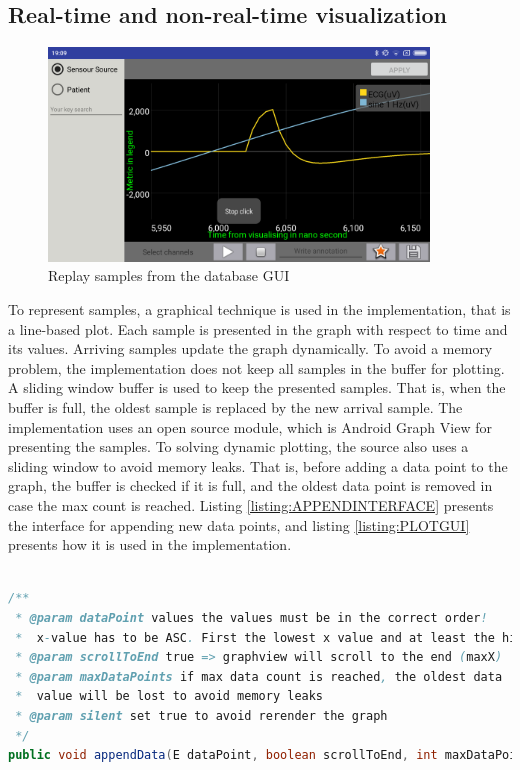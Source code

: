 \subsection{Real-time and non-real-time visualization}
\begin{figure}
    \centering
    \includegraphics[width=0.9\textwidth]{Figures/NONPLOT.png}
    \caption{Replay samples from the database GUI}
    \label{fig:Figures/NONPLOT}
\end{figure}
To represent samples, a graphical technique is used in the implementation, that is a line-based plot. Each sample is presented in the graph with respect to time and its values. Arriving samples update the graph dynamically. To avoid a memory problem, the implementation does not keep all samples in the buffer for plotting. A sliding window buffer is used to keep the presented samples. That is, when the buffer is full, the oldest sample is replaced by the new arrival sample. The implementation uses an open source module, which is Android Graph View\citep{GRAPHVIEWMAIN} for presenting the samples. To solving dynamic plotting, the source also uses a sliding window to avoid memory leaks. That is, before adding a data point to the graph, the buffer is checked if it is full, and the oldest data point is removed in case the max count is reached. Listing \ref{listing:APPENDINTERFACE}\citep{GRAPHVIEW} presents the interface for appending new data points, and listing \ref{listing:PLOTGUI} presents how it is used in the implementation.\\\\
\begin{minipage}{\linewidth}
\begin{lstlisting}[caption={appendData interface\citep{GRAPHVIEW}}, label = {listing:APPENDINTERFACE}, captionpos=b, language=Java, basicstyle=\small]
/**
 * @param dataPoint values the values must be in the correct order!
 *  x-value has to be ASC. First the lowest x value and at least the highest x value.
 * @param scrollToEnd true => graphview will scroll to the end (maxX)
 * @param maxDataPoints if max data count is reached, the oldest data
 *  value will be lost to avoid memory leaks
 * @param silent set true to avoid rerender the graph
 */
public void appendData(E dataPoint, boolean scrollToEnd, int maxDataPoints, boolean silent);
\end{lstlisting}
\end{minipage}
